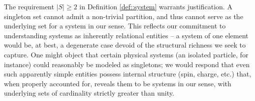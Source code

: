 \begin{remark} \label{rem::cardinality}
The requirement $|S| \geq 2$ in Definition \ref{def::system} warrants justification. A singleton set cannot admit a non-trivial partition, and thus cannot serve as the underlying set for a system in our sense. This reflects our commitment to understanding systems as inherently relational entities -- a system of one element would be, at best, a degenerate case devoid of the structural richness we seek to capture. One might object that certain physical systems (an isolated particle, for instance) could reasonably be modeled as singletons; we would respond that even such apparently simple entities possess internal structure (spin, charge, etc.) that, when properly accounted for, reveals them to be systems in our sense, with underlying sets of cardinality strictly greater than unity.
\end{remark}
